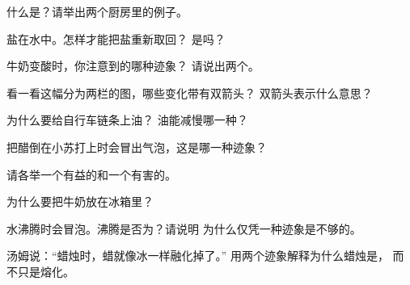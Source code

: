 \begin{exercise}[$\star$]\label{exo:g5:irreversible-changes:2}
什么是？请举出两个厨房里的例子。
\end{exercise}

\begin{exercise}[$\star$]\label{exo:g5:irreversible-changes:3}
盐在水中。怎样才能把盐重新取回？
是吗？
\end{exercise}

\begin{exercise}[$\star$]\label{exo:g5:irreversible-changes:4}
牛奶变酸时，你注意到的哪种迹象？
请说出两个。
\end{exercise}

\begin{exercise}[$\star$]\label{exo:g5:irreversible-changes:5}
看一看这幅分为两栏的图，哪些变化带有双箭头？
双箭头表示什么意思？
\end{exercise}

\begin{exercise}[$\star$]\label{exo:g5:irreversible-changes:6}
为什么要给自行车链条上油？
油能减慢哪一种？
\end{exercise}

\begin{exercise}[$\star$]\label{exo:g5:irreversible-changes:7}
把醋倒在小苏打上时会冒出气泡，这是哪一种迹象？
\end{exercise}

\begin{exercise}[$\star$]\label{exo:g5:irreversible-changes:8}
请各举一个有益的和一个有害的。
\end{exercise}

\begin{exercise}[$\star$]\label{exo:g5:irreversible-changes:9}
为什么要把牛奶放在冰箱里？
\end{exercise}

\begin{exercise}[$\star\star$]\label{exo:g5:irreversible-changes:10}
水沸腾时会冒泡。沸腾是否为？请说明
为什么仅凭一种迹象是不够的。
\end{exercise}

\begin{exercise}[$\star\star$]\label{exo:g5:irreversible-changes:11}
汤姆说：“蜡烛时，蜡就像冰一样融化掉了。”
用两个迹象解释为什么蜡烛是，
而不只是熔化。
\end{exercise}
